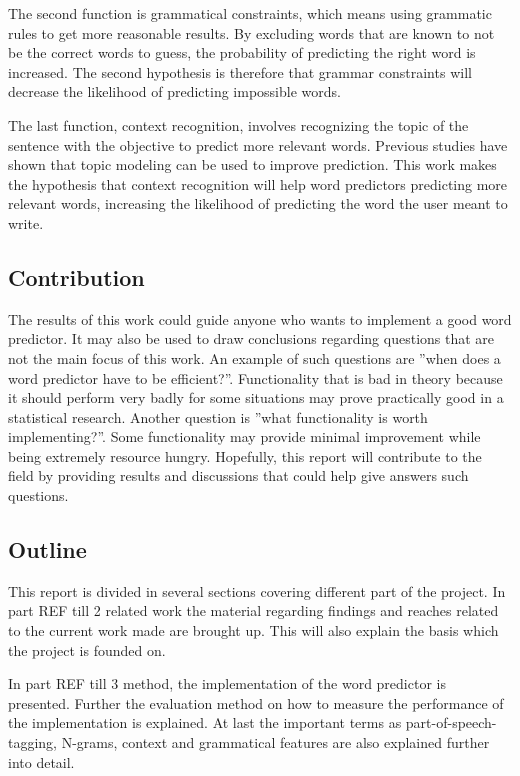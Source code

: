 The second function is grammatical constraints, which means using grammatic rules to get more reasonable results. By excluding words that are known to not be the correct words to guess, the probability of predicting the right word is increased. The second hypothesis is therefore that grammar constraints will decrease the likelihood of predicting impossible words.

The last function, context recognition, involves recognizing the topic of the sentence with the objective to predict more relevant words. Previous studies have shown that topic modeling can be used to improve prediction\cite{DBLP:journals/corr/cs-CL-0009027}\cite{keystrokes}. This work makes the hypothesis that context recognition will help word predictors predicting more relevant words, increasing the likelihood of predicting the word the user meant to write.

\subsection{Contribution}
The results of this work could guide anyone who wants to implement a good word predictor. It may also be used to draw conclusions regarding questions that are not the main focus of this work. An example of such questions are ''when does a word predictor have to be efficient?''. Functionality that is bad in theory because it should perform very badly for some situations may prove practically good in a statistical research. Another question is ''what functionality is worth implementing?''. Some functionality may provide minimal improvement while being extremely resource hungry. Hopefully, this report will contribute to the field by providing results and discussions that could help give answers such questions.

\subsection{Outline}

This report is divided in several sections covering different part of the project. 
In part {REF till 2 related work} the material regarding findings and reaches  related to the current work made are brought up. This will also explain the basis which the project is founded on.   

In part {REF till 3 method}, the implementation of the word predictor is presented. Further the evaluation method  on how to measure the performance  of the implementation is explained. At last the important terms as part-of-speech-tagging, N-grams, context and grammatical features are also explained further into detail. 

